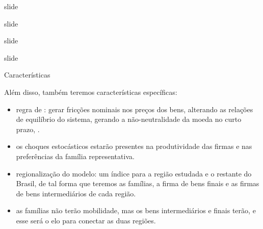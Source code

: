 \documentclass[
presentation.tex
]{subfiles}
\begin{document}
\begin{frame}{slide}
	
	slide
	
\end{frame}


\begin{frame}{slide}
	
	slide
	
\end{frame}


\begin{frame}{Características}

Além disso, também teremos características específicas:

\begin{itemize}
	\item regra de \textcite{calvo_staggered_1983}: gerar fricções nominais nos preços dos bens, alterando as relações de equilíbrio do sistema, gerando a não-neutralidade da moeda no curto prazo, \textcite[p.191]{costa_junior_understanding_2016}.
	
	\item os choques estocásticos estarão presentes na produtividade das firmas e nas preferências da família representativa.
	
	\item regionalização do modelo: um índice para a região estudada e o restante do Brasil, de tal forma que teremos as famílias, a firma de bens finais e as firmas de bens intermediários de cada região.
	
	\item as famílias não terão mobilidade, mas os bens intermediários e finais terão, e esse será o elo para conectar as duas regiões.
\end{itemize}

\end{frame}	
\end{document}
